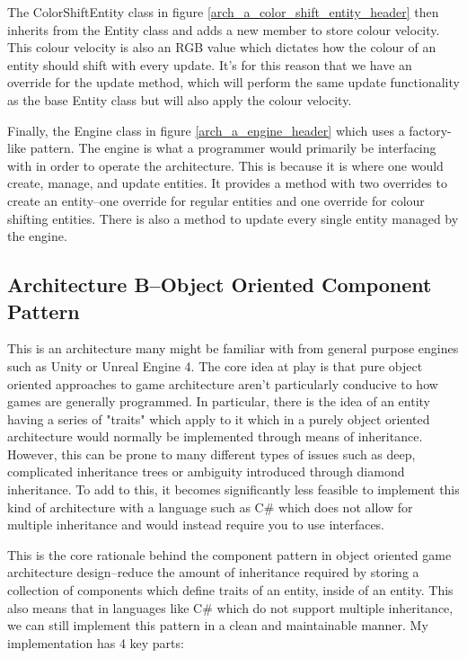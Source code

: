\documentclass{article}
\begin{document}
The ColorShiftEntity class in figure \ref{arch_a_color_shift_entity_header} then
inherits from the Entity class and adds a new member to store colour velocity.
This colour velocity is also an RGB value which dictates how the colour of an
entity should shift with every update. It's for this reason that we have an
override for the update method, which will perform the same update functionality
as the base Entity class but will also apply the colour velocity.

Finally, the Engine class in figure \ref{arch_a_engine_header} which uses a
factory-like pattern. The engine is what a programmer would primarily be
interfacing with in order to operate the architecture. This is because it is
where one would create, manage, and update entities. It provides a method with
two overrides to create an entity--one override for regular entities and one
override for colour shifting entities. There is also a method to update every
single entity managed by the engine.

\subsection{Architecture B--Object Oriented Component Pattern}
This is an architecture many might be familiar with from general purpose engines
such as Unity or Unreal Engine 4. The core idea at play is that pure object
oriented approaches to game architecture aren't particularly conducive to how
games are generally programmed. In particular, there is the idea of an entity
having a series of "traits" which apply to it which in a purely object oriented
architecture would normally be implemented through means of inheritance.
However, this can be prone to many different types of issues such as deep,
complicated inheritance trees or ambiguity introduced through diamond
inheritance. To add to this, it becomes significantly less feasible to implement
this kind of architecture with a language such as C\# which does not allow for
multiple inheritance and would instead require you to use interfaces.

This is the core rationale behind the component pattern in object oriented
game architecture design--reduce the amount of inheritance required by storing
a collection of components which define traits of an entity, inside of an
entity. This also means that in languages like C\# which do not support
multiple inheritance, we can still implement this pattern in a clean and
maintainable manner. My implementation has 4 key parts:
\end{document}
